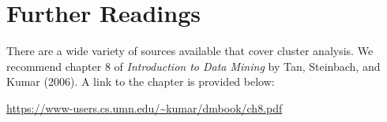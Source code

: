 \section{Further Readings}

There are a wide variety of sources available that cover cluster analysis.
We recommend chapter 8 of \emph{Introduction to Data Mining} by Tan, Steinbach, and Kumar (2006).
A link to the chapter is provided below:

\url{https://www-users.cs.umn.edu/~kumar/dmbook/ch8.pdf}

\printnomenclature
